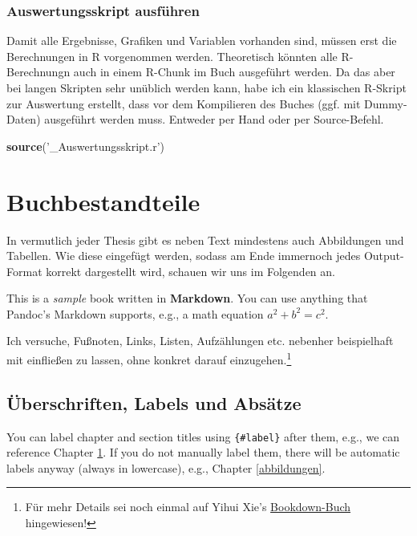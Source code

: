 \documentclass[]{book}
\makeatletter
\newenvironment{Shaded}{\begin{snugshade}}{\end{snugshade}}
\newcommand{\KeywordTok}[1]{\textcolor[rgb]{0.13,0.29,0.53}{\textbf{{#1}}}}
\newcommand{\StringTok}[1]{\textcolor[rgb]{0.31,0.60,0.02}{{#1}}}
\newcommand{\NormalTok}[1]{{#1}}
\let\rmarkdownfootnote\footnote%
\def\footnote{\protect\rmarkdownfootnote}
\newenvironment{kframe}{%
\medskip{}
\setlength{\fboxsep}{.8em}
 \def\at@end@of@kframe{}%
 \ifinner\ifhmode%
  \def\at@end@of@kframe{\end{minipage}}%
  \begin{minipage}{\columnwidth}%
 \fi\fi%
 \def\FrameCommand##1{\hskip\@totalleftmargin \hskip-\fboxsep
 \colorbox{shadecolor}{##1}\hskip-\fboxsep
     \hskip-\linewidth \hskip-\@totalleftmargin \hskip\columnwidth}%
 \MakeFramed {\advance\hsize-\width
   \@totalleftmargin\z@ \linewidth\hsize
   \@setminipage}}%
 {\par\unskip\endMakeFramed%
 \at@end@of@kframe}
\renewenvironment{Shaded}{\begin{kframe}}{\end{kframe}}
\theoremstyle{definition}
\theoremstyle{definition}
\theoremstyle{remark}
\makeatother
\begin{document}
\subsection*{Auswertungsskript
ausführen}\label{auswertungsskript-ausfuhren}

Damit alle Ergebnisse, Grafiken und Variablen vorhanden sind, müssen
erst die Berechnungen in R vorgenommen werden. Theoretisch könnten alle
R-Berechnungn auch in einem R-Chunk im Buch ausgeführt werden. Da das
aber bei langen Skripten sehr unüblich werden kann, habe ich ein
klassischen R-Skript zur Auswertung erstellt, dass vor dem Kompilieren
des Buches (ggf. mit Dummy-Daten) ausgeführt werden muss. Entweder per
Hand oder per Source-Befehl.

\begin{Shaded}
\begin{Highlighting}[]
\KeywordTok{source}\NormalTok{(}\StringTok{'_Auswertungsskript.r'}\NormalTok{)}
\end{Highlighting}
\end{Shaded}

\chapter{Buchbestandteile}\label{components}

In vermutlich jeder Thesis gibt es neben Text mindestens auch
Abbildungen und Tabellen. Wie diese eingefügt werden, sodass am Ende
immernoch jedes Output-Format korrekt dargestellt wird, schauen wir uns
im Folgenden an.

This is a \emph{sample} book written in \textbf{Markdown}. You can use
anything that Pandoc's Markdown supports, e.g., a math equation
\(a^2 + b^2 = c^2\).

Ich versuche, Fußnoten, Links, Listen, Aufzählungen etc. nebenher
beispielhaft mit einfließen zu lassen, ohne konkret darauf
einzugehen.\footnote{Für mehr Details sei noch einmal auf Yihui Xie's
  \href{https://bookdown.org/yihui/bookdown/components.html}{Bookdown-Buch}
  hingewiesen!}

\section{Überschriften, Labels und
Absätze}\label{uberschriften-labels-und-absatze}

You can label chapter and section titles using \texttt{\{\#label\}}
after them, e.g., we can reference Chapter \ref{components}. If you do
not manually label them, there will be automatic labels anyway (always
in lowercase), e.g., Chapter \ref{abbildungen}.
\end{document}
